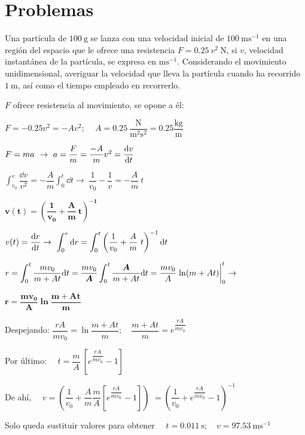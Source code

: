 \section{Problemas}

\begin{prob}
Una partícula de $100 \ \mathrm{g}$ se lanza con una velocidad inicial de $100 \ \mathrm{ms}^{-1}$ en una región del espacio que le ofrece una resistencia  $F=0.25\ v^2\ \mathrm{N}$, si $v$, velocidad instantánea de la partícula, se expresa en $\mathrm{ms}^{-1}$. Considerando el movimiento unidimensional, averiguar la velocidad que lleva la partícula cuando ha recorrido $1\ \mathrm{m}$, así como el tiempo empleado en recorrerlo.
\end{prob}

$F$ ofrece resistencia al movimiento, se opone a él: 

$F=-0.25 v^2=-Av^2$; $\quad A=0.25\ \dfrac{\mathrm{N}}{\mathrm{m}^2\mathrm{s}^2}=0.25 \dfrac{\mathrm{kg}}{\mathrm{m}}$

$F=ma\ \to \ a=\dfrac F m = \dfrac {-A} m v^2 =\displaystyle \dv{v}{t}$

$\displaystyle \int_{v_0}^v \dfrac{\dd v}{v^2}=-\dfrac A m  \int_0^t \dd t \to \ \dfrac 1 {v_0}-\dfrac 1 v =-\dfrac A m \ t $

$\boldsymbol{v(t)=\left(\dfrac 1 {v_0}+\dfrac A m\ t \right)^{-1}}$

$v(t)=\displaystyle \dv{r}{t}\to \ \int_0^r \dd r = \int_0^t \left(\dfrac 1 {v_0}+\dfrac A m\ t \right)^{-1}\dd t$

$r=\displaystyle \int_0^t \dfrac{mv_0}{m+At}\dd t= \dfrac{mv_0}{\boldsymbol {A} }\int_0^t \dfrac{\boldsymbol{ A}}{m+At} \dd t= \dfrac{mv_0}{A} \eval {\ln(m+At)}_0^t \to $

$\boldsymbol{r= \dfrac {mv_0}{A} \ln \dfrac {m+At}{m}}$


Despejando: $\displaystyle \dfrac {rA} {mv_0} =\ln \dfrac {m+At}{m}; \quad \dfrac {m+At}{m} = e^{ \dfrac {rA} {mv_0} } $

Por último: $\quad \boxed{ \displaystyle t=\dfrac {m}{A}\ \left[ e^{\dfrac{rA}{mv_0}} - 1 \right] }$

De ahí, $\quad \boxed{ v=}\left(
\dfrac 1 {v_0}+\dfrac A m \dfrac {m}{A} 
 \left[ e^{ \dfrac{rA}{mv_0} } - 1  \right] 
\right)$
$=\boxed{ \left(  \dfrac 1 {v_0} + e^{\dfrac{rA}{mv_0}} - 1 \right)^{-1} }$

Solo queda sustituir valores para obtener $\quad t=0.011\ \mathrm{s};\quad v=97.53\ \mathrm{ms}^{-1}$

